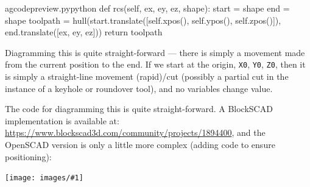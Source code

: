 \documentclass{ltxdoc}
\newcommand{\includeimage}[1]{\bigskip\noindent\texttt{[image: images/\#1]}\bigskip}
\begin{document}
\lstset{firstnumber=\thegcpy}
\begin{writecode}{a}{gcodepreview.py}{python}
    def rcs(self, ex, ey, ez, shape):
        start = shape
        end = shape
        toolpath = hull(start.translate([self.xpos(), self.ypos(), self.zpos()]), 
                        end.translate([ex, ey, ez]))
        return toolpath

\end{writecode}
\addtocounter{gcpy}{7}

Diagramming this is quite straight-forward --- there is simply a movement made from the current position to the end. If we start at the origin, \verb|X0|, \verb|Y0|, \verb|Z0|, then it is simply a straight-line movement (rapid)/cut (possibly a partial cut in the instance of a keyhole or roundover tool), and no variables change value.

The code for diagramming this is quite straight-forward. A BlockSCAD implementation is available at: \url{https://www.blockscad3d.com/community/projects/1894400}, and the OpenSCAD version is only a little more complex (adding code to ensure positioning):

\includeimage{gcp_statemachine_0_0_0_50_25_-10.png}%
\end{document}
